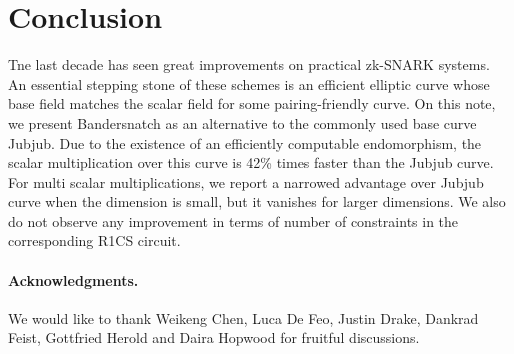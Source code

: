 \documentclass{article}
\theoremstyle{definition}
\begin{document}
\section{Conclusion}
Tne last decade has seen great improvements on practical zk-SNARK systems.
An essential stepping stone of these schemes is an efficient elliptic
curve whose base field matches the scalar field for some pairing-friendly curve.
On this note, we present Bandersnatch as an alternative to the commonly used
base curve Jubjub. Due to the existence of an efficiently computable
endomorphism, the scalar multiplication over this curve is 42\% times
faster than the Jubjub curve.
For multi scalar multiplications, we report a narrowed advantage over Jubjub 
curve when the dimension is small, but it vanishes for larger
dimensions.
We also do not observe any improvement in terms of number of constraints in 
the corresponding R1CS circuit.


\bigskip
\paragraph*{\textbf{Acknowledgments.}} We would like to thank Weikeng Chen, Luca De
Feo, Justin Drake, Dankrad Feist, Gottfried Herold and Daira Hopwood for
fruitful discussions.



\end{document}
